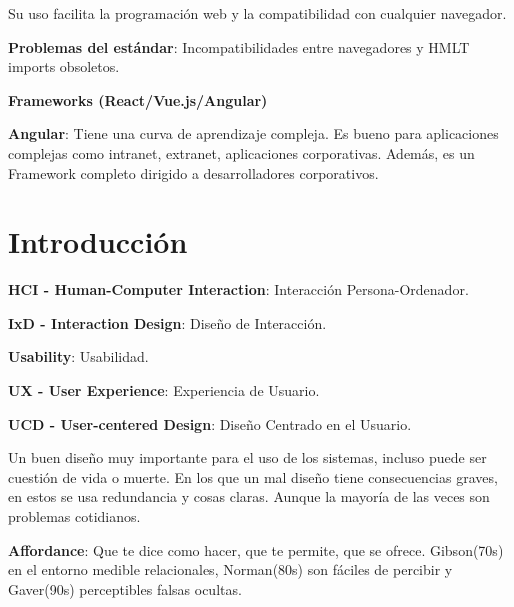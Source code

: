 \documentclass[12pt]{report} %
\begin{document}
Su uso facilita la programación web y la compatibilidad con cualquier
navegador.

\textbf{Problemas del estándar}: Incompatibilidades entre navegadores y
HMLT imports obsoletos.

\textbf{Frameworks (React/Vue.js/Angular)}

\textbf{Angular}: Tiene una curva de aprendizaje compleja. Es bueno para aplicaciones complejas como intranet, extranet, aplicaciones corporativas. Además, es un Framework completo dirigido a desarrolladores corporativos.

\chapter{Introducción}

\textbf{HCI - Human-Computer Interaction}: Interacción
Persona-Ordenador.

\textbf{IxD - Interaction Design}: Diseño de Interacción.

\textbf{Usability}: Usabilidad.

\textbf{UX - User Experience}: Experiencia de Usuario.

\textbf{UCD - User-centered Design}: Diseño Centrado en el Usuario.

Un buen diseño muy importante para el uso de los sistemas, incluso puede ser cuestión de vida o muerte. En los que un mal diseño tiene consecuencias graves, en estos se usa redundancia y cosas claras. Aunque la mayoría de las veces son problemas cotidianos.

\textbf{Affordance}: Que te dice como hacer, que te permite, que se
ofrece. Gibson(70s) en el entorno medible relacionales, Norman(80s) son
fáciles de percibir y Gaver(90s) perceptibles falsas ocultas.
\end{document}

